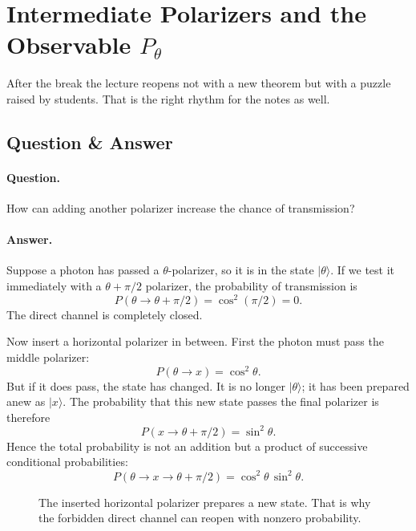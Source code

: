 \section{Intermediate Polarizers and the Observable \(P_\theta\)}

After the break the lecture reopens not with a new theorem but with a puzzle raised by students. That is the right rhythm for the notes as well.

\subsection{Question \& Answer}

\paragraph{Question.}
How can adding another polarizer increase the chance of transmission?

\paragraph{Answer.}
Suppose a photon has passed a \(\theta\)-polarizer, so it is in the state \(|\theta\rangle\). If we test it immediately with a \(\theta+\pi/2\) polarizer, the probability of transmission is
\begin{equation}
P(\theta\to \theta+\pi/2)=\cos^2(\pi/2)=0.
\end{equation}
The direct channel is completely closed.

Now insert a horizontal polarizer in between. First the photon must pass the middle polarizer:
\begin{equation}
P(\theta\to x)=\cos^2\theta.
\end{equation}
But if it does pass, the state has changed. It is no longer \(|\theta\rangle\); it has been prepared anew as \(|x\rangle\). The probability that this new state passes the final polarizer is therefore
\begin{equation}
P(x\to \theta+\pi/2)=\sin^2\theta.
\end{equation}
Hence the total probability is not an addition but a product of successive conditional probabilities:
\begin{equation}
P(\theta\to x\to \theta+\pi/2)=\cos^2\theta\,\sin^2\theta.
\end{equation}

\begin{figure}
\centering
{}
\caption{The inserted horizontal polarizer prepares a new state. That is why the forbidden direct channel can reopen with nonzero probability.}
\end{figure}

